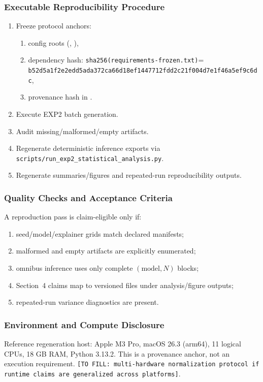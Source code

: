 \documentclass[twoside,11pt]{article}
\begin{document}
\subsubsection{Executable Reproducibility Procedure}
\begin{enumerate}[leftmargin=*]
    \item Freeze protocol anchors:
    \begin{enumerate}[leftmargin=*]
        \item config roots (, ),
        \item dependency hash: \texttt{sha256(requirements-frozen.txt)}=
        \texttt{b52d5a1f2e2edd5ada372ca66d18ef1447712fdd2c21f004d7e1f46a5ef9c6dc},
        \item provenance hash in .
    \end{enumerate}
    \item Execute EXP2 batch generation.
    \item Audit missing/malformed/empty artifacts.
    \item Regenerate deterministic inference exports via
    \texttt{scripts/run\_exp2\_statistical\_analysis.py}.
    \item Regenerate summaries/figures and repeated-run reproducibility outputs.
\end{enumerate}

\subsubsection{Quality Checks and Acceptance Criteria}
A reproduction pass is claim-eligible only if:
\begin{enumerate}[leftmargin=*]
    \item seed/model/explainer grids match declared manifests;
    \item malformed and empty artifacts are explicitly enumerated;
    \item omnibus inference uses only complete $(\text{model},N)$ blocks;
    \item Section~4 claims map to versioned files under analysis/figure outputs;
    \item repeated-run variance diagnostics are present.
\end{enumerate}

\subsubsection{Environment and Compute Disclosure}
Reference regeneration host: Apple M3 Pro, macOS 26.3 (arm64), 11 logical CPUs,
18 GB RAM, Python 3.13.2. This is a provenance anchor, not an execution
requirement. \texttt{[TO FILL: multi-hardware normalization protocol if runtime claims are generalized across platforms]}.
\end{document}
